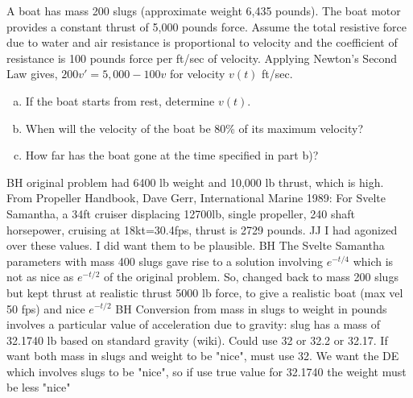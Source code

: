 \documentclass[12pt]{book}
\begin{document}
\begin{exercise}
{\color{blue}
A boat has mass 200 slugs (approximate weight 6,435 pounds). The boat motor provides a constant thrust of 5,000 pounds force. Assume the total resistive force due to water and air resistance is proportional to velocity and the coefficient of resistance is 100 pounds force per ft/sec of velocity. Applying Newton's Second Law gives, $200v'=5,000-100v$ for velocity $v(t)$ ft/sec.}
\begin{enumerate}[a)]
    \item If the boat starts from rest, determine $v(t)$.
    \item When will the velocity of the boat be 80\% of its maximum velocity?
    \item How far has the boat gone at the time specified in part b)? 
\end{enumerate}
{\color{teal}BH original problem had 6400 lb weight and 10,000 lb thrust, 
which is high. 
From Propeller Handbook, Dave Gerr, International Marine 1989:
For Svelte Samantha, 
a 34ft cruiser displacing 12700lb, single propeller, 240 shaft horsepower, 
cruising at 18kt=30.4fps, thrust is 2729 pounds.
JJ I had agonized over these values. I did want them to be plausible. BH The Svelte Samantha parameters with
mass 400 slugs gave rise to a solution involving 
$e^{-t/4}$ which is not as nice as $e^{-t/2}$ of
the original problem. So, changed back to mass 200 slugs
but kept thrust at realistic thrust 5000 lb force, to give a realistic boat (max vel 50 fps) and nice $e^{-t/2}$
}
{\color{teal}BH Conversion from mass in slugs to weight in pounds
involves a particular value of acceleration due to gravity:
slug has a mass of 32.1740 lb based on standard gravity (wiki).
Could use 32 or 32.2 or 32.17. If want both mass in slugs
and weight to be "nice", must use 32. We want the DE which
involves slugs to be "nice", so if use true value for 32.1740
the weight must be less "nice"}

\end{exercise}

\end{document}
